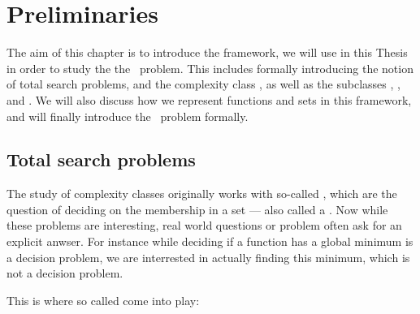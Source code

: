 \setchapterpreamble[u]{\margintoc}
\chapter{Preliminaries}

The aim of this chapter is to introduce the framework, we will use in this Thesis in order to study the the \Tarski\ problem. This includes formally introducing the notion of total search problems, and the complexity class \TFNP, as well as the subclasses \PLS, \PPAD, and \EOPL. We will also discuss how we represent functions and sets in this framework, and will finally introduce the \Tarski\ problem formally.

\section{Total search problems}

The study of complexity classes originally works with so-called , which are the question of deciding on the membership in a set --- also called a .
Now while these problems are interesting, real world questions or problem often ask for an explicit anwser.
For instance while deciding if a function has a global minimum is a decision problem, we are interrested in actually finding this minimum, which is not a decision problem.

This is where so called  come into play:

